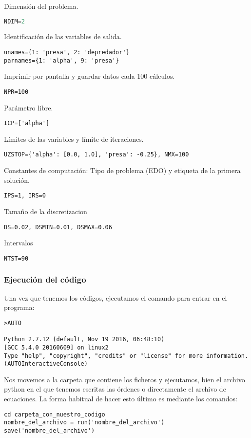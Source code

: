 Dimensión del problema.
\begin{lstlisting}[language=Python]
NDIM=2
\end{lstlisting}
 Identificación de las variables de salida.
\begin{lstlisting}
unames={1: 'presa', 2: 'depredador'}
parnames={1: 'alpha', 9: 'presa'}
\end{lstlisting}
Imprimir por pantalla y guardar datos cada 100 cálculos.
\begin{lstlisting}
NPR=100
\end{lstlisting}
 Parámetro libre.
\begin{lstlisting}
ICP=['alpha']
\end{lstlisting}
 Límites de las variables y límite de iteraciones.
\begin{lstlisting}
UZSTOP={'alpha': [0.0, 1.0], 'presa': -0.25}, NMX=100
\end{lstlisting}
 Constantes de computación: Tipo de problema (EDO) y etiqueta de la primera solución.
\begin{lstlisting}
IPS=1, IRS=0
\end{lstlisting}
 Tamaño de la discretizacion
\begin{lstlisting}
DS=0.02, DSMIN=0.01, DSMAX=0.06
\end{lstlisting}
 Intervalos
\begin{lstlisting}
NTST=90
\end{lstlisting}

\subsubsection{Ejecución del código} 
Una vez que tenemos los códigos, ejecutamos el comando para entrar en el programa:
\begin{lstlisting}
>AUTO

Python 2.7.12 (default, Nov 19 2016, 06:48:10) 
[GCC 5.4.0 20160609] on linux2
Type "help", "copyright", "credits" or "license" for more information.
(AUTOInteractiveConsole)
\end{lstlisting}

Nos movemos a la carpeta que contiene los ficheros y ejecutamos, bien el archivo python en el que tenemos escritas las órdenes o directamente el archivo de ecuaciones. La forma habitual de hacer esto último es mediante los comandos:
\begin{lstlisting}
cd carpeta_con_nuestro_codigo
nombre_del_archivo = run('nombre_del_archivo')
save('nombre_del_archivo')
\end{lstlisting}

